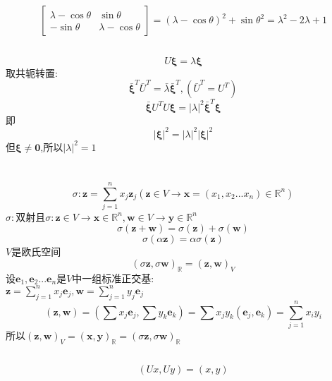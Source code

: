 \documentclass[11pt, a4paper, UTF8]{ctexart}
\begin{document}
\section{}
\[\begin{bmatrix}
\lambda-\cos\theta&\sin\theta\\
-\sin\theta&\lambda-\cos\theta
\end{bmatrix}=(\lambda-\cos\theta)^2+\sin\theta^2=\lambda^2-2\lambda+1\]
\subsection{}
\[U\bm\xi=\lambda\bm\xi\]
取共轭转置:\\
\[\bar{\bm\xi}^T\bar U^T=\bar\lambda\bar{\bm\xi}^T,(\bar U^T=U^T)\]
\[\bar{\bm\xi}U^TU\bm\xi=|\lambda|^2\bar{\bm\xi}^T\bm\xi\]
即\\
\[|\bm\xi|^2=|\lambda|^2|\bm\xi|^2\]
但$\bm\xi\not=\bm0$,所以$|\lambda|^2=1$\\
\section{}
\[\sigma:\bm z=\sum_{j=1}^nx_j\bm z_j(\bm z\in V\to\bm x=(x_1,x_2...x_n)\in\mathbb{R}^n)\]
$\sigma:$双射且$\sigma:\bm z\in V\to\bm x\in\mathbb{R}^n,\bm w\in V\to\bm y\in\mathbb{R}^n$\\
\[\sigma(\bm z+\bm w)=\sigma(\bm z)+\sigma(\bm w)\]
\[\sigma(\alpha\bm z)=\alpha\sigma(\bm z)\]
$V$是欧氏空间\\
\[(\sigma\bm z,\sigma\bm w)_{\mathbb{R}}=(\bm z,\bm w)_V\]
设$\bm e_1,\bm e_2...\bm e_n$是$V$中一组标准正交基:\\
$\bm z=\sum_{j=1}^nx_j\bm e_j,\bm w=\sum_{j=1}^ny_j\bm e_j$\\
\[(\bm z,\bm w)=(\sum x_j\bm e_j,\sum y_k\bm e_k)=\sum x_jy_k(\bm e_j,\bm e_k)=\sum_{j=1}^nx_iy_i\]
所以$(\bm z,\bm w)_V=(\bm x,\bm y)_{\mathbb{R}}=(\sigma\bm z,\sigma\bm w)_{\mathbb{R}}$\\
\subsection{}
\subsection{}
\subsection{}
\[(Ux,Uy)=(x,y)\]
\end{document}

